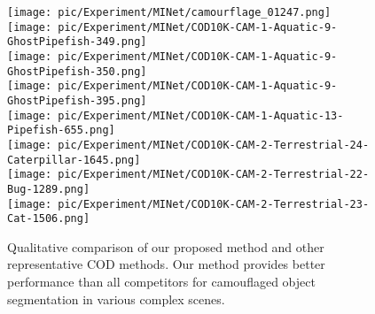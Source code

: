 \documentclass{ecai}
\begin{document}
\begin{figure*}[t]
{\begin{minipage}[t]{0.1\textwidth}
                \vspace{0.01\linewidth}
			\texttt{[image: pic/Experiment/MINet/camourflage\_01247.png]}\\
			\vspace{0.01\linewidth}
                \texttt{[image: pic/Experiment/MINet/COD10K-CAM-1-Aquatic-9-GhostPipefish-349.png]}\\
			\vspace{0.01\linewidth}
                \texttt{[image: pic/Experiment/MINet/COD10K-CAM-1-Aquatic-9-GhostPipefish-350.png]}\\
			\vspace{0.01\linewidth}
                \texttt{[image: pic/Experiment/MINet/COD10K-CAM-1-Aquatic-9-GhostPipefish-395.png]}\\
			\vspace{0.01\linewidth}
			\texttt{[image: pic/Experiment/MINet/COD10K-CAM-1-Aquatic-13-Pipefish-655.png]}\\
			\vspace{0.01\linewidth}
			\texttt{[image: pic/Experiment/MINet/COD10K-CAM-2-Terrestrial-24-Caterpillar-1645.png]}\\
			\vspace{0.01\linewidth}
                \texttt{[image: pic/Experiment/MINet/COD10K-CAM-2-Terrestrial-22-Bug-1289.png]}\\
                \vspace{0.01\linewidth}
			\texttt{[image: pic/Experiment/MINet/COD10K-CAM-2-Terrestrial-23-Cat-1506.png]}\\
			\vspace{0.08\linewidth}
		\end{minipage}%
	}\hspace{0.018\columnwidth}
	\centering
	\caption{Qualitative comparison of our proposed method and other representative COD methods. Our method provides better performance than all competitors for camouflaged object segmentation in various complex scenes.}
    \label{fig3}
    \vspace{5mm}
\end{figure*}
\end{document}

